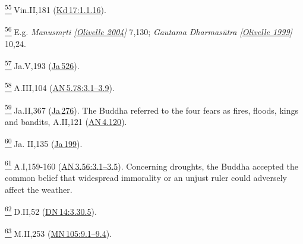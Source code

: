 \label{footprints_split_024.html_fn55}
\hyperref[footprints_split_006.htmlux5cux23fnref55]{\textsuperscript{55}} Vin.II,181
(\href{https://suttacentral.net/pli-tv-kd17/en/brahmali\#1.1.16}{Kd\,17:1.1.16}).

\label{footprints_split_024.html_fn56}
\hyperref[footprints_split_006.htmlux5cux23fnref56]{\textsuperscript{56}} E.g.
\emph{{Manusmṛti
{{[}\hyperref[footprints_split_022.htmlux5cux23Olivelleux5cux25202004]{Olivelle
2004}{]}}}} 7,130; \emph{{Gautama Dharmasūtra
{{[}\hyperref[footprints_split_022.htmlux5cux23Olivelleux5cux25201999]{Olivelle
1999}{]}}}} 10,24.

\label{footprints_split_024.html_fn57}
\hyperref[footprints_split_006.htmlux5cux23fnref57]{\textsuperscript{57}} Ja.V,193
(\href{https://suttacentral.net/ja526}{Ja\,526}).

\label{footprints_split_024.html_fn58}
\hyperref[footprints_split_006.htmlux5cux23fnref58]{\textsuperscript{58}} A.III,104
(\href{https://suttacentral.net/an5.78/en/sujato\#3.1}{AN\,5.78:3.1--3.9}).

\label{footprints_split_024.html_fn59}
\hyperref[footprints_split_006.htmlux5cux23fnref59]{\textsuperscript{59}} Ja.II,367
(\href{https://suttacentral.net/ja276}{Ja\,276}). The Buddha referred to
the four fears as fires, floods, kings and bandits, A.II,121
(\href{https://suttacentral.net/an4.120/en/sujato}{AN\,4.120}).

\label{footprints_split_024.html_fn60}
\hyperref[footprints_split_006.htmlux5cux23fnref60]{\textsuperscript{60}} Ja.
II,135 (\href{https://suttacentral.net/ja199}{Ja\,199}).

\label{footprints_split_024.html_fn61}
\hyperref[footprints_split_006.htmlux5cux23fnref61]{\textsuperscript{61}} A.I,159-160
(\href{https://suttacentral.net/an3.56/en/sujato\#3.1}{AN\,3.56:3.1--3.5}).
Concerning droughts, the Buddha accepted the common belief that
widespread immorality or an unjust ruler could adversely affect the
weather.

\label{footprints_split_024.html_fn62}
\hyperref[footprints_split_006.htmlux5cux23fnref62]{\textsuperscript{62}} D.II,52
(\href{https://suttacentral.net/dn14/en/sujato\#3.30.5}{DN\,14:3.30.5}).

\label{footprints_split_024.html_fn63}
\hyperref[footprints_split_006.htmlux5cux23fnref63]{\textsuperscript{63}} M.II,253
(\href{https://suttacentral.net/mn105/en/sujato\#9.1}{MN\,105:9.1--9.4}).

